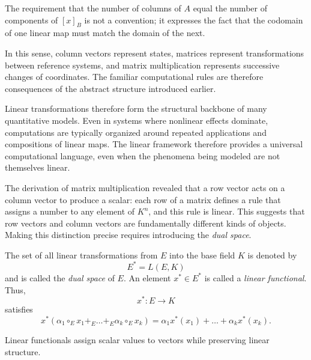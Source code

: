 \medskip

The requirement that the number of columns of $A$ equal the number of components of $[x]_B$ is not a convention; it expresses the fact that the codomain of one linear map must match the domain of the next.

\medskip

In this sense, column vectors represent states, matrices represent transformations between reference systems, and matrix multiplication represents successive changes of coordinates. The familiar computational rules are therefore consequences of the abstract structure introduced earlier.

\medskip


Linear transformations therefore form the structural backbone of many quantitative models.
Even in systems where nonlinear effects dominate, computations are typically organized
around repeated applications and compositions of linear maps. The linear framework
therefore provides a universal computational language, even when the phenomena being
modeled are not themselves linear.

\medskip


The derivation of matrix multiplication revealed that a row vector acts on a column
vector to produce a scalar: each row of a matrix defines a rule that assigns a number
to any element of $K^n$, and this rule is linear. This suggests that row vectors
and column vectors are fundamentally different kinds of objects. Making this distinction
precise requires introducing the \emph{dual space}.

\medskip

The set of all linear transformations from $E$ into the base field $K$ is denoted by
\[
E^* = L(E,K)
\]
and is called the \emph{dual space} of $E$. An element $x^* \in E^*$ is called a \emph{linear functional}. Thus,
\[
x^* : E \to K
\]
satisfies
\[
x^*(\alpha_1 \circ_E x_1 +_E \dots +_E \alpha_k \circ_E x_k)
=
\alpha_1 x^*(x_1) + \dots + \alpha_k x^*(x_k).
\]

Linear functionals assign scalar values to vectors while preserving linear structure.

\medskip

